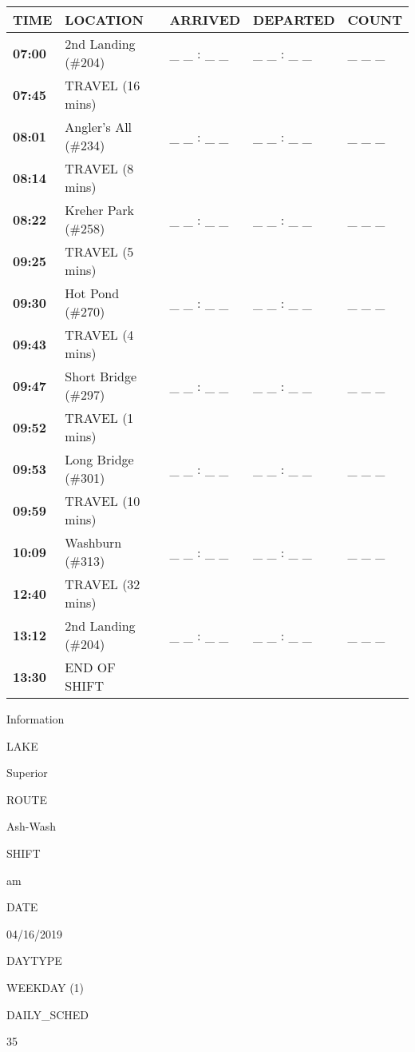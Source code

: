 \documentclass[]{article}
\begin{document}
\begin{tabular}{>{\bfseries}lllll}
\toprule
\textbf{TIME} & \textbf{LOCATION} & \textbf{ARRIVED} & \textbf{DEPARTED} & \textbf{COUNT}\\
\midrule
07:00 & 2nd Landing (\#204) & \_ \_ : \_ \_ & \_ \_ : \_ \_ & \_ \_ \_\\
07:45 & TRAVEL (16 mins) &  &  & \\
08:01 & Angler's All (\#234) & \_ \_ : \_ \_ & \_ \_ : \_ \_ & \_ \_ \_\\
08:14 & TRAVEL (8 mins) &  &  & \\
08:22 & Kreher Park (\#258) & \_ \_ : \_ \_ & \_ \_ : \_ \_ & \_ \_ \_\\
09:25 & TRAVEL (5 mins) &  &  & \\
09:30 & Hot Pond (\#270) & \_ \_ : \_ \_ & \_ \_ : \_ \_ & \_ \_ \_\\
09:43 & TRAVEL (4 mins) &  &  & \\
09:47 & Short Bridge (\#297) & \_ \_ : \_ \_ & \_ \_ : \_ \_ & \_ \_ \_\\
09:52 & TRAVEL (1 mins) &  &  & \\
09:53 & Long Bridge (\#301) & \_ \_ : \_ \_ & \_ \_ : \_ \_ & \_ \_ \_\\
09:59 & TRAVEL (10 mins) &  &  & \\
10:09 & Washburn (\#313) & \_ \_ : \_ \_ & \_ \_ : \_ \_ & \_ \_ \_\\
12:40 & TRAVEL (32 mins) &  &  & \\
13:12 & 2nd Landing (\#204) & \_ \_ : \_ \_ & \_ \_ : \_ \_ & \_ \_ \_\\
13:30 & END OF SHIFT &  &  & \\
\bottomrule
\end{tabular}\newpage

Information

LAKE

Superior

ROUTE

Ash-Wash

SHIFT

am

DATE

04/16/2019

DAYTYPE

WEEKDAY (1)

DAILY\_SCHED

35

\vspace{24pt}
\end{document}
